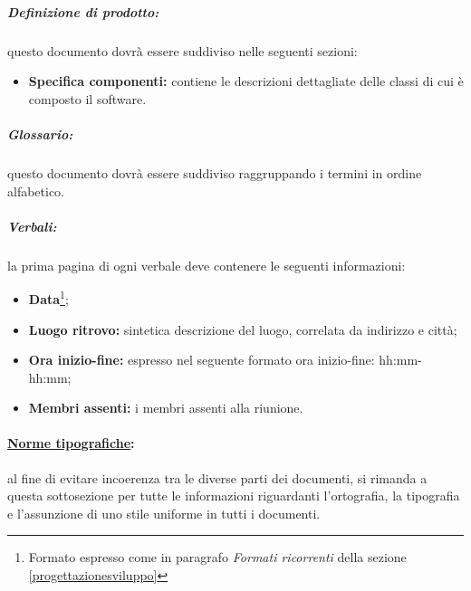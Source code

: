 \subparagraph{Definizione di prodotto:}
\label{pardefinizioneprodotto}
 questo documento dovrà essere suddiviso nelle seguenti sezioni:
\begin{itemize}
\item \textbf{Specifica componenti:} contiene le descrizioni dettagliate delle classi di cui è composto il software.
\end{itemize}

\subparagraph{Glossario:} questo documento dovrà essere suddiviso raggruppando i termini in ordine alfabetico.

\subparagraph{Verbali:} la prima pagina di ogni verbale deve contenere le seguenti informazioni:
\begin{itemize}
\item \textbf{Data}\footnote{Formato espresso come in paragrafo \textit{Formati ricorrenti} della sezione \ref{progettazionesviluppo}};
\item \textbf{Luogo ritrovo:} sintetica descrizione del luogo, correlata da indirizzo e città;
\item \textbf{Ora inizio-fine:} espresso nel seguente formato ora inizio-fine: hh:mm-hh:mm;
\item \textbf{Membri assenti:} i membri assenti alla riunione.
\end{itemize}

\paragraph{\underline{Norme tipografiche}:}
\label{norme tipografiche}
al fine di evitare incoerenza tra le diverse parti dei documenti, si rimanda a questa sottosezione per tutte le informazioni riguardanti l'ortografia, la tipografia e l'assunzione di uno stile uniforme in tutti i documenti.	

